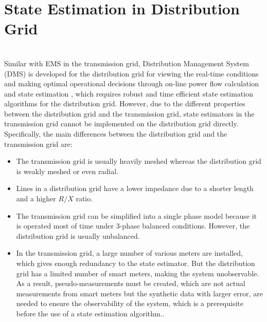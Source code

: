 \section{State Estimation in Distribution Grid}
\\Similar with EMS in the transmission grid, Distribution Management System (DMS) is developed for the distribution grid for viewing the real-time conditions and making optimal operational decisions through on-line power flow calculation and state estimation
\cite{meliopoulos1996multiphase}, which requires robust and time efficient state estimation algorithms for the distribution grid. However, due to the different properties between the distribution grid and the transmission grid, state estimators in the transmission grid cannot be implemented on the distribution grid directly. Specifically, the main differences between the distribution grid and the transmission grid are:
\begin{itemize}
    \item The transmission grid is usually heavily meshed whereas the distribution grid is weakly meshed or even radial.
    \item Lines in a distribution grid have a lower impedance due to a shorter length and a higher $R/X$ ratio.
    \item The transmission grid can be simplified into a single phase model because it is operated most of time under 3-phase balanced conditions. However, the distribution grid is usually unbalanced.
    \item In the transmission grid, a large number of various meters are installed, which gives enough redundancy to the state estimator. But the distribution grid has a limited number of smart meters, making the system unobservable. As a result, pseudo-measurements must be created, which are not actual measurements from smart meters but the synthetic data with larger error, are needed to ensure the observability of the system,  which is a prerequisite before the use of a state estimation algorithm..
\end{itemize}

